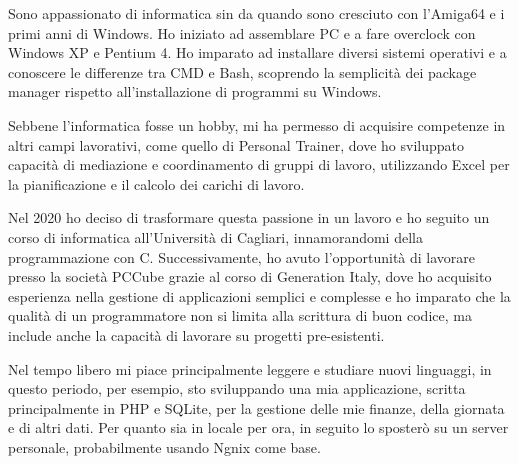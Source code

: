 Sono appassionato di informatica sin da quando sono cresciuto con l'Amiga64 
e i primi anni di Windows. Ho iniziato ad assemblare PC e a fare overclock 
con Windows XP e Pentium 4. Ho imparato ad installare diversi sistemi operativi 
e a conoscere le differenze tra CMD e Bash, scoprendo la semplicità dei package 
manager rispetto all'installazione di programmi su Windows. 

Sebbene l'informatica 
fosse un hobby, mi ha permesso di acquisire competenze in altri campi lavorativi, 
come quello di Personal Trainer, dove ho sviluppato capacità di mediazione e 
coordinamento di gruppi di lavoro, utilizzando Excel per la pianificazione e il 
calcolo dei carichi di lavoro. 

Nel 2020 ho deciso di trasformare questa passione 
in un lavoro e ho seguito un corso di informatica all'Università di Cagliari, 
innamorandomi della programmazione con C. Successivamente, ho avuto l'opportunità 
di lavorare presso la società PCCube grazie al corso di Generation Italy, dove 
ho acquisito esperienza nella gestione di applicazioni semplici e complesse e ho 
imparato che la qualità di un programmatore non si limita alla scrittura di buon 
codice, ma include anche la capacità di lavorare su progetti pre-esistenti.

Nel tempo libero mi piace principalmente leggere e studiare nuovi linguaggi, 
in questo periodo, per esempio, sto sviluppando una mia applicazione, scritta 
principalmente in PHP e SQLite, per la gestione delle mie finanze, della giornata
e di altri dati. Per quanto sia in locale per ora, in seguito lo sposterò su un 
server personale, probabilmente usando Ngnix come base.